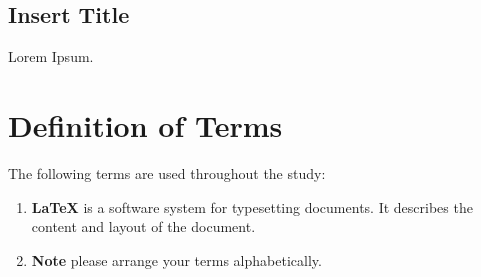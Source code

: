     \subsection{Insert Title}
        Lorem Ipsum.



\section{Definition of Terms}
    \label{sec:Definition of Terms}

    The following terms are used throughout the study:

    \begin{enumerate}
        \item 
            \textbf{LaTeX} \textemdash is a software system for typesetting documents. It describes the content and layout of the document.
        \item 
            \textbf{Note} \textemdash please arrange your terms alphabetically.
    \end{enumerate}
